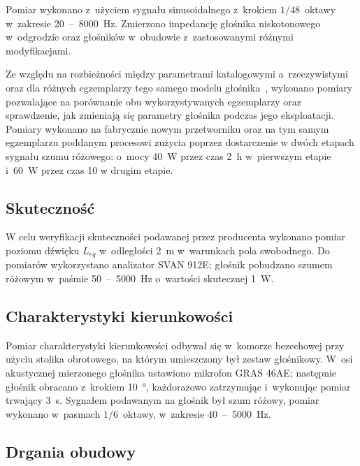 \documentclass[12pt]{oska}
\newcommand{\range}[2]{\num{#1}~--~\num{#2}}
\begin{document}
	
	Pomiar wykonano z~użyciem sygnału sinusoidalnego z~krokiem $1/48$~oktawy w~zakresie \range{20}{8000}~\si{\hertz}. Zmierzono impedancję głośnika niskotonowego w~odgrodzie oraz głośników w~obudowie z~zastosowanymi różnymi modyfikacjami.
	
	Ze względu na rozbieżności między parametrami katalogowymi a~rzeczywistymi oraz dla różnych egzemplarzy tego samego modelu głośnika~\cite{aes_roznice}, wykonano pomiary pozwalające na porównanie obu wykorzystywanych egzemplarzy oraz sprawdzenie, jak zmieniają się parametry głośnika podczas jego eksploatacji. Pomiary wykonano na fabrycznie nowym przetworniku oraz na tym samym egzemplarzu poddanym procesowi zużycia poprzez dostarczenie w dwóch etapach sygnału szumu różowego: o~mocy \SI{40}{\watt} przez czas \SI{2}{\hour} w~pierwszym etapie i~\SI{60}{\watt} przez czas \SI{10}{\min} w drugim etapie.
	
	\subsection{Skuteczność}
	
	W celu weryfikacji skuteczności podawanej przez producenta wykonano pomiar poziomu dźwięku $L_{eq}$ w~odległości \SI{2}{\metre} w~warunkach pola swobodnego. Do pomiarów wykorzystano analizator SVAN 912E; głośnik pobudzano szumem różowym w~paśmie \range{50}{5000}~\si{\hertz} o~wartości skutecznej \SI{1}{\watt}. 
	
	\subsection{Charakterystyki kierunkowości}
	
	
	Pomiar charakterystyki kierunkowości odbywał się w~komorze bezechowej przy użyciu stolika obrotowego, na którym umieszczony był zestaw głośnikowy. W~osi akustycznej mierzonego głośnika ustawiono mikrofon GRAS 46AE; następnie głośnik obracano z~krokiem \SI{10}{\degree}, każdorazowo zatrzymując i~wykonując pomiar trwający \SI{3}{\s}. Sygnałem podawanym na głośnik był szum różowy, pomiar wykonano w~pasmach $1/6$~oktawy, w~zakresie \range{40}{5000}~\si{\hertz}.
	
	\subsection{Drgania obudowy}
	
\end{document}
